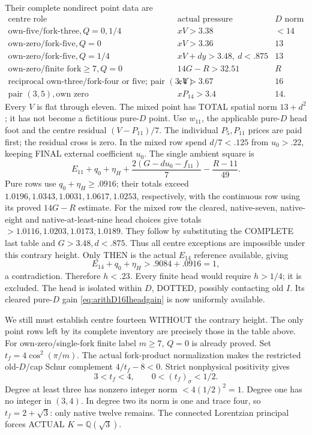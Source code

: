 \documentclass[11pt]{article}
\begin{document}
Their complete nondirect point data are
\[
\begin{array}{c|c|c}
 \text{centre role}&\text{actual pressure}&D\text{ norm}\\ \hline
 \text{own-five/fork-three},Q=0,1/4&xV>3.38&<14\\
 \text{own-zero/fork-five},Q=0&xV>3.36&13\\
 \text{own-zero/fork-five},Q=1/4&xV+d y>3.48,\ d<.875&13\\
 \text{own-zero/finite fork}\ge7,Q=0&
                    14G-R>32.51&R\\
 \text{reciprocal own-three/fork-four or five; pair }(3,4)&xV>3.67&16\\
 \text{pair }(3,5),\text{own zero}&xP_{14}>3.4&14 .
\end{array}
\]
Every \(V\) is flat through eleven.
The mixed point has TOTAL spatial
norm \(13+d^2\); it has not become
a fictitious pure-\(D\) point.
Use \(w_{11}\), the applicable pure-\(D\)
head foot and the centre residual
\((V-P_{11})/7\).
The individual \(P_5,P_{11}\) prices
are paid first; the residual cross
is zero.
In the mixed row spend \(d/7<.125\)
from \(u_0>.22\), keeping FINAL external
coefficient \(u_0\).
The single ambient square is
\[
 E_{11}+q_0+\eta_H+
           {\frac{2(G-d u_0-f_{11})}{7}}-{\frac{R-11}{49}}.
\]
Pure rows use \(q_0+\eta_H\ge.0916\);
their totals exceed
\(1.0196,1.0343,1.0031,1.0617,1.0253\),
respectively, with the continuous row
using its proved \(14G-R\) estimate.
For the mixed row the cleared, native-seven,
native-eight and native-at-least-nine
head choices give totals \(>1.0116,
1.0203,1.0173,1.0189\).
They follow by substituting the COMPLETE
last table and \(G>3.48,d<.875\).
Thus all centre exceptions are impossible
under this contrary height.
Only THEN is the actual \(E_{14}\)
reference available, giving
\[
                         E_{14}+q_0+\eta_H>.9084+.0916=1 ,
\]
a contradiction.
Therefore \(h<.23\).
Every finite head would require \(h>1/4\);
it is excluded.
The head is isolated within \(D\),
DOTTED, possibly contacting old \(I\).
Its cleared pure-\(D\) gain
\eqref{eq:arithD16Iheadgain} is now
uniformly available.

We still must establish centre fourteen
WITHOUT the contrary height.
The only point rows left by its complete
inventory are precisely those in the
table above.
For own-zero/single-fork finite label
\(m\ge7\), \(Q=0\) is already proved.
Set \(t_f=4\cos^2(\pi/m)\).
The actual fork-product normalization
makes the restricted old-\(D\)/cap
Schur complement \(4/t_f-8<0\).
Strict nonphysical positivity gives
\[
                          3<t_f<4,\qquad0<(t_f)_\sigma<1/2 .
\]
Degree at least three has nonzero
integer norm \(<4(1/2)^2=1\).
Degree one has no integer in \((3,4)\).
In degree two its norm is one and
trace four, so
\(t_f=2+\sqrt3\): only native twelve
remains.
The connected Lorentzian principal
forces ACTUAL \(K=\mathbb Q(\sqrt3)\).
\end{document}
